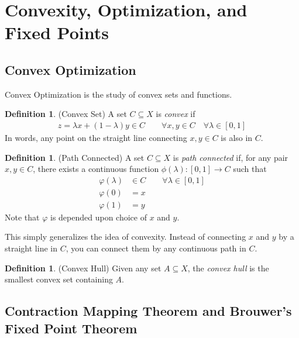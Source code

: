 \documentclass[12pt]{article}
\theoremstyle{plain}
\theoremstyle{definition}
\newtheorem{defn}[thm]{Definition}
\theoremstyle{remark}
\begin{document}
\section{Convexity, Optimization, and Fixed Points}

\subsection{Convex Optimization}

Convex Optimization is the study of convex sets and functions.

\begin{defn}{(Convex Set)}
A set $C\subseteq X$ is \emph{convex} if
\begin{align*}
  z = \lambda x + (1-\lambda) y \in C
  \qquad \forall x,y\in C\quad \forall \lambda \in [0,1]
\end{align*}
In words, any point on the straight line connecting $x,y\in C$ is also
in $C$.
\end{defn}

\begin{defn}{(Path Connected)}
A set $C\subseteq X$ is \emph{path connected} if, for any pair $x,y\in
C$, there exists a continuous function $\phi(\lambda):[0,1]\rightarrow
C$ such that
\begin{align*}
  \varphi(\lambda) &\in C \qquad \forall \lambda \in [0,1]\\
  \varphi(0) &= x\\
  \varphi(1) &= y
\end{align*}
Note that $\varphi$ is depended upon choice of $x$ and $y$.

This simply generalizes the idea of convexity. Instead of connecting $x$
and $y$ by a straight line in $C$, you can connect them by any
continuous path in $C$.
\end{defn}

\begin{defn}{(Convex Hull)}
Given any set $A\subseteq X$, the \emph{convex hull} is the smallest
convex set containing $A$.
\end{defn}

\subsection{Contraction Mapping Theorem and Brouwer's Fixed Point Theorem}
\end{document}
